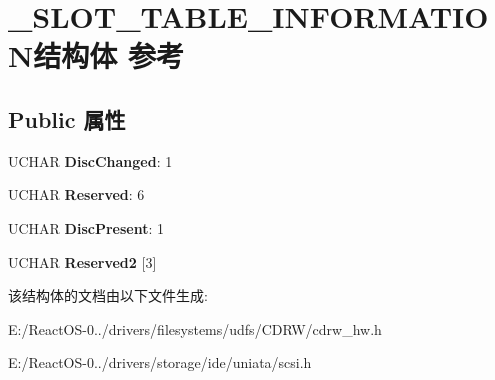 \hypertarget{struct___s_l_o_t___t_a_b_l_e___i_n_f_o_r_m_a_t_i_o_n}{}\section{\+\_\+\+S\+L\+O\+T\+\_\+\+T\+A\+B\+L\+E\+\_\+\+I\+N\+F\+O\+R\+M\+A\+T\+I\+O\+N结构体 参考}
\label{struct___s_l_o_t___t_a_b_l_e___i_n_f_o_r_m_a_t_i_o_n}
\subsection*{Public 属性}
\begin{DoxyCompactItemize}
\item 
\mbox{\label{struct___s_l_o_t___t_a_b_l_e___i_n_f_o_r_m_a_t_i_o_n_acf98f0c265b2c3314b8a710e5114a62d}} 
U\+C\+H\+AR {\bfseries Disc\+Changed}\+: 1
\item 
\mbox{\label{struct___s_l_o_t___t_a_b_l_e___i_n_f_o_r_m_a_t_i_o_n_aec95d2260436c4d20c107584ca9750da}} 
U\+C\+H\+AR {\bfseries Reserved}\+: 6
\item 
\mbox{\label{struct___s_l_o_t___t_a_b_l_e___i_n_f_o_r_m_a_t_i_o_n_a14a474453fa7dfb15b348ee516b8d71d}} 
U\+C\+H\+AR {\bfseries Disc\+Present}\+: 1
\item 
\mbox{\label{struct___s_l_o_t___t_a_b_l_e___i_n_f_o_r_m_a_t_i_o_n_adaf041bc97276169d5d8c68920ac9fd7}} 
U\+C\+H\+AR {\bfseries Reserved2} \mbox{[}3\mbox{]}
\end{DoxyCompactItemize}


该结构体的文档由以下文件生成\+:\begin{DoxyCompactItemize}
\item 
E\+:/\+React\+O\+S-\/0../drivers/filesystems/udfs/\+C\+D\+R\+W/cdrw\+\_\+hw.\+h\item 
E\+:/\+React\+O\+S-\/0../drivers/storage/ide/uniata/scsi.\+h\end{DoxyCompactItemize}
